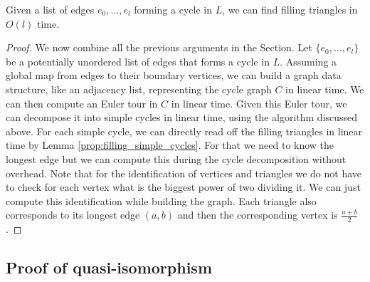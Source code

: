\documentclass[a4paper,UKenglish,cleveref,nolineno,autoref]{socg-lipics-v2021}
\begin{document}
\begin{lemma} \label{prop:cycle_finding}
Given a list of edges $e_0,\ldots,e_l$ forming a cycle in $L$, we can find filling triangles in $O(l)$ time.
\end{lemma}

\begin{proof}
We now combine all the previous arguments in the Section. Let $\{e_0,\ldots,e_l\}$ be a potentially unordered list of edges that forms a cycle in $L$. Assuming a global map from edges to their boundary vertices, we can build a graph data structure, like an adjacency list, representing the cycle graph $C$ in linear time. We can then compute an Euler tour in $C$ in linear time. Given this Euler tour, we can decompose it into simple cycles in linear time, using the algorithm discussed above. For each simple cycle, we can directly read off the filling triangles in linear time by Lemma \ref{prop:filling_simple_cycles}. For that we need to know the longest edge but we can compute this during the cycle decomposition without overhead. Note that for the identification of vertices and triangles we do not have to check for each vertex what is the biggest power of two dividing it. We can just compute this identification while building the graph. Each triangle also corresponds to its longest edge $(a,b)$ and then the corresponding vertex is $\frac{a+b}{2}$. 
\end{proof}



\subsection{Proof of quasi-isomorphism}
\label{app:quasiiso_logpath}
\end{document}
